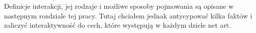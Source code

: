 \documentclass[a4paper,12pt,twoside]{article}
\begin{document}
Definicje interakcji, jej rodzaje i możliwe sposoby pojmowania są opisane
w następnym rozdziale tej pracy. Tutaj chciałem jednak antycypować
kilka faktów i zaliczyć interaktywność do cech, które występują w każdym
dziele net art.





%
%
%
%
%
\end{document}
